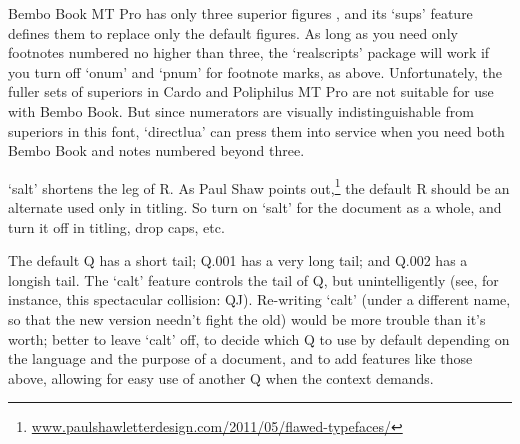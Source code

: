 \documentclass{article}
\begin{document}
Bembo Book MT Pro has only three superior figures , and its ‘sups’
feature defines them to replace only the default figures. As long as
you need only footnotes numbered no higher than three, the
‘realscripts’ package will work if you turn off ‘onum’ and ‘pnum’ for
footnote marks, as above. Unfortunately, the fuller sets of superiors
in Cardo and Poliphilus MT Pro are not suitable for use with Bembo
Book. But since numerators are visually indistinguishable from
superiors in this font, ‘directlua’ can press them into service when
you need both Bembo Book and notes numbered beyond three.

‘salt’ shortens the leg of R\@. As Paul Shaw points
out,\footnote{\href{http://www.paulshawletterdesign.com/2011/05/flawed-typefaces/}{www.paulshawletterdesign.com/2011/05/flawed-typefaces/}}
the default R should be an alternate used only in titling. So turn on
‘salt’ for the document as a whole, and turn it off in titling, drop
caps, etc.

The default Q has a short tail;
{Q.001} has a very long tail; and
{Q.002} has a longish tail. The
‘calt’ feature controls the tail of Q, but unintelligently (see, for
instance, this spectacular collision:
{QJ).}  Re-writing ‘calt’
(under a different name, so that the new version needn’t fight the
old) would be more trouble than it’s worth; better to leave ‘calt’
off, to decide which Q to use by default depending on the language and
the purpose of a document, and to add features like those above,
allowing for easy use of another Q when the context demands.
\end{document}

